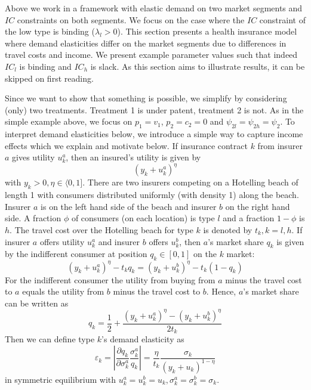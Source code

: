 \documentclass[a4paper,12pt]{article}
\begin{document}
Above we work in a framework with elastic demand on two market segments and \(IC\) constraints on both segments. We focus on the case where the \(IC\) constraint of the low type is binding (\(\lambda_l>0\)). This section presents a health insurance model where demand elasticities differ on the market segments due to differences in travel costs and income. We present example parameter values such that indeed \(IC_l\) is binding and \(IC_h\) is slack. As this section aims to illustrate results, it can be skipped on first reading.

Since we want to show that something is possible, we simplify by considering (only) two treatments. Treatment 1 is under patent, treatment 2 is not. As in the simple example above, we focus on \(p_1=v_1\), \(p_2=c_2=0\) and \(\psi_{2l}=\psi_{2h}=\psi_2\). To interpret demand elasticities below, we introduce a simple way to capture income effects which we explain and motivate below. If insurance contract \(k\) from insurer \(a\) gives utility \(u_k^a\), then an insured's utility is given by
\begin{equation}
\label{eq:50}
(y_k+u_k^a)^{\eta}
\end{equation}
with \(y_k>0, \eta \in \langle 0,1]\). There are two insurers competing on a Hotelling beach of length 1 with consumers distributed uniformly (with density 1) along the beach. Insurer \(a\) is on the left hand side of the beach and insurer \(b\) on the right hand side. A fraction \(\phi\) of consumers (on each location) is type \(l\) and a fraction \(1-\phi\) is \(h\). The travel cost over the Hotelling beach for type \(k\) is denoted by \(t_k, k=l,h\). If insurer \(a\) offers utility \(u_k^a\) and insurer \(b\) offers \(u_k^b\), then \(a\)'s market share \(q_k\) is given by the indifferent consumer at position \(q_k \in [0,1]\) on the \(k\) market:
\begin{equation}
\label{eq:18}
(y_k+u_k^a)^{\eta} - t_k q_k = (y_k+u_k^b)^{\eta} - t_k (1-q_k)
\end{equation}
For the indifferent consumer the utility from buying from \(a\) minus the travel cost to \(a\) equals the utility from \(b\) minus the travel cost to \(b\). Hence, \(a\)'s market share can be written as
\begin{equation}
\label{eq:19}
q_k = \frac{1}{2} + \frac{(y_k+u_k^a)^{\eta} - (y_k+u_k^b)^{\eta}}{2t_k}
\end{equation}
Then we can define type \(k\)'s demand elasticity as
\begin{equation}
\label{eq:51}
\varepsilon_k = \left| \frac{\partial q_k}{\partial \sigma_k^a} \frac{\sigma_k^a}{q_k} \right| = \frac{\eta}{t_k}\frac{\sigma_k}{(y_k+u_k)^{1-\eta}}
\end{equation}
in symmetric equilibrium with \(u_k^a=u_k^b=u_k,\sigma_k^a=\sigma_k^{b}=\sigma_k\).
\end{document}

